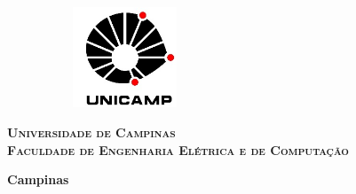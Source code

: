 



\thispagestyle{plain}

\includegraphics[width=7cm, height=3cm,keepaspectratio=true]{imgs/logo}
\begin{center}
  {
  
  \large\textbf{\textsc{Universidade de Campinas}}\\
  \large\textbf{\textsc{Faculdade de Engenharia Elétrica e de Computação}}
  
  }
\end{center}
\vfill
\begin{center}
  {\large\textbf{\textsc{\autor}}}
\end{center}
\vfill
\begin{center}
  {\Large\textbf{\textsc{\titulobr}}}
\end{center}

\vspace{0.5cm}

\begin{center}
  {\Large\textbf{\textsc{\titulo}}}
\end{center}


\vfill


\vspace{4cm}

\vfill
\begin{center}
  \textbf{Campinas \\ \ano}
\end{center}